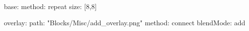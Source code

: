 base:
  method: repeat
  size: [8,8]

overlay:
  path: "Blocks/Misc/add_overlay.png"
  method: connect
  blendMode: add